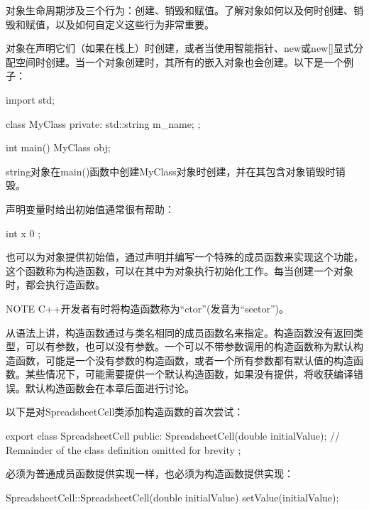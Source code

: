 
对象生命周期涉及三个行为：创建、销毁和赋值。了解对象如何以及何时创建、销毁和赋值，以及如何自定义这些行为非常重要。


对象在声明它们（如果在栈上）时创建，或者当使用智能指针、new或new[]显式分配空间时创建。当一个对象创建时，其所有的嵌入对象也会创建。以下是一个例子：

\begin{cpp}
import std;

class MyClass
{
    private:
    std::string m_name;
};

int main()
{
    MyClass obj;
}
\end{cpp}

string对象在main()函数中创建MyClass对象时创建，并在其包含对象销毁时销毁。

声明变量时给出初始值通常很有帮助：

\begin{cpp}
int x { 0 };
\end{cpp}

也可以为对象提供初始值，通过声明并编写一个特殊的成员函数来实现这个功能，这个函数称为构造函数，可以在其中为对象执行初始化工作。每当创建一个对象时，都会执行造函数。

\begin{myNotic}{NOTE}
C++开发者有时将构造函数称为“ctor”(发音为“seetor”)。
\end{myNotic}


从语法上讲，构造函数通过与类名相同的成员函数名来指定。构造函数没有返回类型，可以有参数，也可以没有参数。一个可以不带参数调用的构造函数称为默认构造函数，可能是一个没有参数的构造函数，或者一个所有参数都有默认值的构造函数。某些情况下，可能需要提供一个默认构造函数，如果没有提供，将收获编译错误。默认构造函数会在本章后面进行讨论。

以下是对SpreadsheetCell类添加构造函数的首次尝试：

\begin{cpp}
export class SpreadsheetCell
{
    public:
        SpreadsheetCell(double initialValue);
        // Remainder of the class definition omitted for brevity
};
\end{cpp}

必须为普通成员函数提供实现一样，也必须为构造函数提供实现：

\begin{cpp}
SpreadsheetCell::SpreadsheetCell(double initialValue)
{
    setValue(initialValue);
}
\end{cpp}

